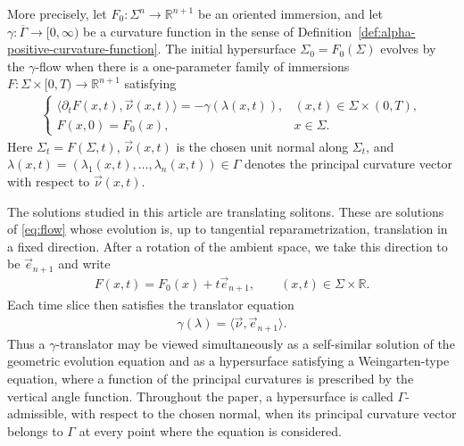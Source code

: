 \documentclass{amsart}
\theoremstyle{plain}
\theoremstyle{mainintrothm}
\theoremstyle{definition}
\begin{document}
\medskip

More precisely, let $F_0:\Sigma^n\to\mathbb R^{n+1}$ be an oriented immersion,
and let $\gamma:\overline\Gamma\to[0,\infty)$ be a curvature function in the
sense of Definition~\ref{def:alpha-positive-curvature-function}.  The initial
hypersurface $\Sigma_0=F_0(\Sigma)$ evolves by the $\gamma$-flow when there is a
one-parameter family of immersions
$F:\Sigma\times[0,T)\to\mathbb R^{n+1}$ satisfying
\begin{align}
	\label{eq:flow}
	\begin{cases}
		\langle \partial_tF(x,t),\vec{\nu}(x,t)\rangle
		=
		-\gamma(\lambda(x,t)),
		& (x,t)\in\Sigma\times(0,T),\\
		F(x,0)=F_0(x),
		& x\in\Sigma.
	\end{cases}
\end{align}
Here $\Sigma_t=F(\Sigma,t)$, $\vec{\nu}(x,t)$ is the chosen unit normal along
$\Sigma_t$, and
$\lambda(x,t)=(\lambda_1(x,t),\ldots,\lambda_n(x,t))\in\Gamma$ denotes the
principal curvature vector with respect to $\vec{\nu}(x,t)$.

\medskip

The solutions studied in this article are translating solitons.  These are
solutions of \eqref{eq:flow} whose evolution is, up to tangential
reparametrization, translation in a fixed direction.  After a rotation of the
ambient space, we take this direction to be $\vec e_{n+1}$ and write
\begin{align*}
	F(x,t)=F_0(x)+t\vec e_{n+1},
	\qquad
	(x,t)\in\Sigma\times\mathbb R.
\end{align*}
Each time slice then satisfies the translator equation
\begin{align}
	\label{eq:gamma-translator-equation}
	\gamma(\lambda)=\langle \vec{\nu},\vec e_{n+1}\rangle .
\end{align}
Thus a $\gamma$-translator may be viewed simultaneously as a self-similar
solution of the geometric evolution equation and as a hypersurface satisfying a
Weingarten-type equation, where a function of the principal curvatures is
prescribed by the vertical angle function.  Throughout the paper, a hypersurface
is called $\Gamma$-admissible, with respect to the chosen normal, when its
principal curvature vector belongs to $\Gamma$ at every point where the equation
is considered.

\medskip
\end{document}
